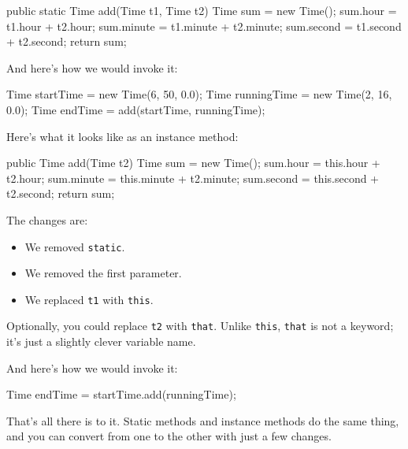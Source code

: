 \documentclass[12pt]{book}
\theoremstyle{exercise}
\newcommand{\java}[1]{\verb"#1"}
\begin{document}

\begin{code}
    public static Time add(Time t1, Time t2) {
        Time sum = new Time();
        sum.hour = t1.hour + t2.hour;
        sum.minute = t1.minute + t2.minute;
        sum.second = t1.second + t2.second;
        return sum;
    }
\end{code}

And here's how we would invoke it:

\begin{code}
    Time startTime = new Time(6, 50, 0.0);
    Time runningTime = new Time(2, 16, 0.0);
    Time endTime = add(startTime, runningTime);
\end{code}

Here's what it looks like as an instance method:


\begin{code}
    public Time add(Time t2) {
        Time sum = new Time();
        sum.hour = this.hour + t2.hour;
        sum.minute = this.minute + t2.minute;
        sum.second = this.second + t2.second;
        return sum;
    }
\end{code}

The changes are:

\begin{itemize}

\item We removed \java{static}.

\item We removed the first parameter.

\item We replaced \java{t1} with \java{this}.

\end{itemize}

Optionally, you could replace \java{t2} with \java{that}.
Unlike \java{this}, \java{that} is not a keyword; it's just a slightly clever variable name.

And here's how we would invoke it:

\begin{code}
    Time endTime = startTime.add(runningTime);
\end{code}

That's all there is to it.
Static methods and instance methods do the same thing, and you can convert from one to the other with just a few changes.
\end{document}
